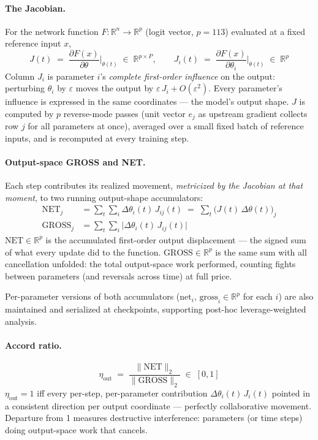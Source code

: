 \documentclass[11pt]{article}
\begin{document}
\paragraph{The Jacobian.} For the network function $F : \mathbb{R}^n \to \mathbb{R}^p$
(logit vector, $p = 113$) evaluated at a fixed reference input $x$,
\begin{equation}
    J(t) \;=\; \frac{\partial F(x)}{\partial \theta}\bigg|_{\theta(t)} \;\in\; \mathbb{R}^{p \times P},
    \qquad
    J_i(t) \;=\; \frac{\partial F(x)}{\partial \theta_i}\bigg|_{\theta(t)} \;\in\; \mathbb{R}^{p}
\end{equation}
Column $J_i$ is parameter $i$'s \emph{complete first-order influence} on the output:
perturbing $\theta_i$ by $\varepsilon$ moves the output by $\varepsilon\, J_i + O(\varepsilon^2)$.
Every parameter's influence is expressed in the same coordinates --- the model's output shape.
$J$ is computed by $p$ reverse-mode passes (unit vector $e_j$ as upstream gradient collects row
$j$ for all parameters at once), averaged over a small fixed batch of reference inputs, and is
recomputed at every training step.

\paragraph{Output-space GROSS and NET.} Each step contributes its realized movement,
\emph{metricized by the Jacobian at that moment}, to two running output-shape accumulators:
\begin{align}
    \mathrm{NET}_j &= \sum_t \sum_i \Delta\theta_i(t)\, J_{ij}(t)
        \;=\; \sum_t \bigl(J(t)\,\Delta\theta(t)\bigr)_j \\[2pt]
    \mathrm{GROSS}_j &= \sum_t \sum_i \bigl|\Delta\theta_i(t)\, J_{ij}(t)\bigr|
\end{align}
$\mathrm{NET} \in \mathbb{R}^p$ is the accumulated first-order output displacement --- the signed
sum of what every update did to the function. $\mathrm{GROSS} \in \mathbb{R}^p$ is the same sum
with all cancellation unfolded: the total output-space work performed, counting fights between
parameters (and reversals across time) at full price.

Per-parameter versions of both accumulators
($\mathrm{net}_i,\, \mathrm{gross}_i \in \mathbb{R}^p$ for each $i$) are also maintained and
serialized at checkpoints, supporting post-hoc leverage-weighted analysis.

\paragraph{Accord ratio.}
\begin{equation}
    \eta_{\mathrm{out}} \;=\; \frac{\|\mathrm{NET}\|_2}{\|\mathrm{GROSS}\|_2} \;\in\; [0, 1]
\end{equation}
$\eta_{\mathrm{out}} = 1$ iff every per-step, per-parameter contribution
$\Delta\theta_i(t)\,J_i(t)$ pointed in a consistent direction per output coordinate ---
perfectly collaborative movement. Departure from 1 measures destructive interference:
parameters (or time steps) doing output-space work that cancels.
\end{document}
